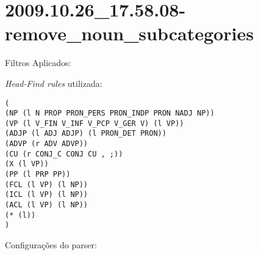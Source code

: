 \section{2009.10.26_17.58.08-remove_noun_subcategories} %
\label{sec:exp:2009.10.26_17.58.08-remove_noun_subcategories}

Filtros Aplicados:

\begin{itemize}
  
  \item{\emph{RemoveNounSubcategories}
  
\end{itemize}

\emph{Head-Find rules} utilizada:

\scriptsize
\begin{verbatim}
(
(NP (l N PROP PRON_PERS PRON_INDP PRON NADJ NP))
(VP (l V_FIN V_INF V_PCP V_GER V) (l VP))
(ADJP (l ADJ ADJP) (l PRON_DET PRON))
(ADVP (r ADV ADVP))
(CU (r CONJ_C CONJ CU , ;))
(X (l VP))
(PP (l PRP PP))
(FCL (l VP) (l NP))
(ICL (l VP) (l NP))
(ACL (l VP) (l NP))
(* (l))
)

\end{verbatim}

\normalsize

Configurações do parser:

